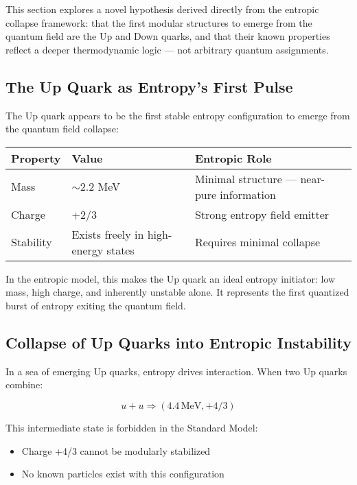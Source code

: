 \documentclass[12pt]{article}
\begin{document}
This section explores a novel hypothesis derived directly from the entropic collapse framework: that the first modular structures to emerge from the quantum field are the Up and Down quarks, and that their known properties reflect a deeper thermodynamic logic — not arbitrary quantum assignments.

\subsection{The Up Quark as Entropy’s First Pulse}

The Up quark appears to be the first stable entropy configuration to emerge from the quantum field collapse:

\vspace{0.5em}
\begin{center}
\begin{tabular}{|l|l|p{8cm}|}
\hline
\textbf{Property} & \textbf{Value} & \textbf{Entropic Role} \\
\hline
Mass & $\sim$2.2 MeV & Minimal structure — near-pure information \\
\hline
Charge & +2/3 & Strong entropy field emitter \\
\hline
Stability & Exists freely in high-energy states & Requires minimal collapse \\
\hline
\end{tabular}
\end{center}
\vspace{0.5em}

In the entropic model, this makes the Up quark an ideal entropy initiator: low mass, high charge, and inherently unstable alone. It represents the first quantized burst of entropy exiting the quantum field.

\subsection{Collapse of Up Quarks into Entropic Instability}

In a sea of emerging Up quarks, entropy drives interaction. When two Up quarks combine:

\[
u + u \Rightarrow (4.4\, \text{MeV}, +4/3)
\]

This intermediate state is forbidden in the Standard Model:
\begin{itemize}
    \item Charge +4/3 cannot be modularly stabilized
    \item No known particles exist with this configuration
\end{itemize}
\end{document}
